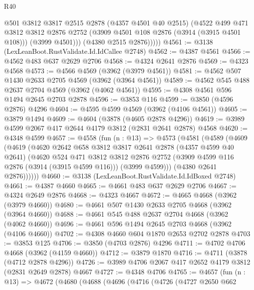 \begin{lexlean}{R40}
\begin{coremodule}
              @501
              @3812
              @3817
              @2515
              @2878
              (@4357 @4501 @40 @2515)
              (@4522
                @499
                @471
                @3812
                @3812
                @2876
                @2752
                (@3909 @4501 @108 @2876 (@3914 (@3915 @4501 @108)))
                (@3999 @4501)))
            (@4380 @2515 @2876)))))
@4561 := @3138 (LexLeanBoot.RustValidate.Id.IdCallee @2748)
@4562 := @4387 @4561
@4566 := @4562 @483 @637 @2629 @2706
@4568 := @4324 @2641 @2876
@4569 := @4323 @4568
@4573 := @4566 @4569 (@3962 (@3979 @4561))
@4581 := @4562 @507 @1430 @2633 @2705 @4569 (@3962 (@3964 @4561))
@4589 := @4562 @545 @488 @2637 @2704 @4569 (@3962 (@4062 @4561))
@4595 := @4308 @4561 @596 @1494 @2645 @2703 @2878
@4596 := @3853 @116
@4599 := @3850 (@4596 @2876) @4296
@4604 := @4595 @4599 @4569 (@3962 (@4106 @4561))
@4605 := @3879 @1494
@4609 := @4604 (@3878 (@4605 @2878 @4296))
@4619 := @3989 @4599 @2067 @417 @2644 @4179 @3812 (@2831 @2641 @2878) @4568
@4620 := @4348 @4599
@4657 := @4558
    (fun (n : @13) =>
    @4573
      (@4581
        (@4589
          (@4609
            (@4619
              (@4620
                @2642
                @658
                @3812
                @3817
                @2641
                @2878
                (@4357 @4599 @40 @2641)
                (@4620
                  @524
                  @471
                  @3812
                  @3812
                  @2876
                  @2752
                  (@3909 @4599 @116 @2876 (@3914 (@3915 @4599 @116)))
                  (@3999 @4599)))
              (@4380 @2641 @2876))))))
@4660 := @3138 (LexLeanBoot.RustValidate.Id.IdBoxed @2748)
@4661 := @4387 @4660
@4665 := @4661 @483 @637 @2629 @2706
@4667 := @4324 @2649 @2876
@4668 := @4323 @4667
@4672 := @4665 @4668 (@3962 (@3979 @4660))
@4680 := @4661 @507 @1430 @2633 @2705 @4668 (@3962 (@3964 @4660))
@4688 := @4661 @545 @488 @2637 @2704 @4668 (@3962 (@4062 @4660))
@4696 := @4661 @596 @1494 @2645 @2703 @4668 (@3962 (@4106 @4660))
@4702 := @4308 @4660 @604 @1870 @2653 @2702 @2878
@4703 := @3853 @125
@4706 := @3850 (@4703 @2876) @4296
@4711 := @4702 @4706 @4668 (@3962 (@4159 @4660))
@4712 := @3879 @1870
@4716 := @4711 (@3878 (@4712 @2878 @4296))
@4726 := @3989 @4706 @2067 @417 @2652 @4179 @3812 (@2831 @2649 @2878) @4667
@4727 := @4348 @4706
@4765 := @4657
    (fun (n : @13) =>
    @4672
      (@4680
        (@4688
          (@4696
            (@4716
              (@4726
                (@4727
                  @2650
                  @662

\end{coremodule}
\end{lexlean}
